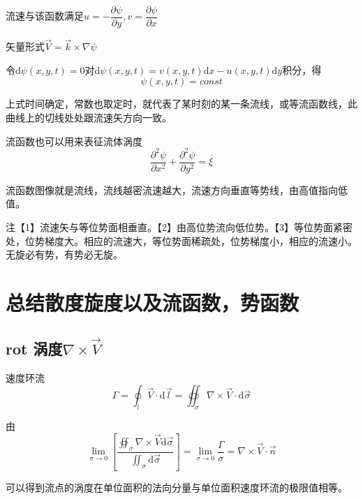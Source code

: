 \documentclass[a4paper,oneside]{ctexbook}
\begin{document}
流速与该函数满足\(u=-\dfrac{\partial\psi}{\partial{y}},v=\dfrac{\partial\psi}{\partial{x}}\)

矢量形式\(\overrightarrow{V}=\overrightarrow{k}\times\nabla\psi\)

令\(\mathrm{d}\psi(x,y,t)=0\)对\(\mathrm{d}\psi(x,y,t)=v(x,y,t)\mathrm{d}x-u(x,y,t)\mathrm{d}y\)积分，得
\begin{equation}
    \psi(x,y,t)=const
\end{equation}

上式时间确定，常数也取定时，就代表了某时刻的某一条流线，或等流函数线，此曲线上的切线处处跟流速矢方向一致。

流函数也可以用来表征流体涡度
\begin{equation}
    \dfrac{\partial^2\psi}{\partial{x^2}}+\dfrac{\partial^2\psi}{\partial{y^2}}=\xi
\end{equation}

流函数图像就是流线，流线越密流速越大，流速方向垂直等势线，由高值指向低值。

注【1】流速矢与等位势面相垂直。【2】由高位势流向低位势。【3】等位势面紧密处，位势梯度大。相应的流速大，等位势面稀疏处，位势梯度小，相应的流速小。无旋必有势，有势必无旋。

\section{总结散度旋度以及流函数，势函数}

\subsection{rot 涡度\(\nabla\times\overrightarrow{V}\)}

速度环流
\begin{equation}
    \Gamma=\oint_l\overrightarrow{V}\cdot\mathrm{d}\overrightarrow{l}=\oiint_\sigma\nabla\times\overrightarrow{V}\cdot\mathrm{d}\overrightarrow{\sigma}
\end{equation}

由
\begin{equation}
    \lim_{\sigma\to0}\left[\dfrac{\oiint_\sigma\nabla\times\overrightarrow{V}\mathrm{d}\overrightarrow{\sigma}}{\iint_\sigma\mathrm{d}\overrightarrow{\sigma}}\right]=\lim_{\sigma\to0}\dfrac{\Gamma}{\sigma}=\nabla\times\overrightarrow{V}\cdot\overrightarrow{n}
\end{equation}

可以得到流点的涡度在单位面积的法向分量与单位面积速度环流的极限值相等。
\end{document}

